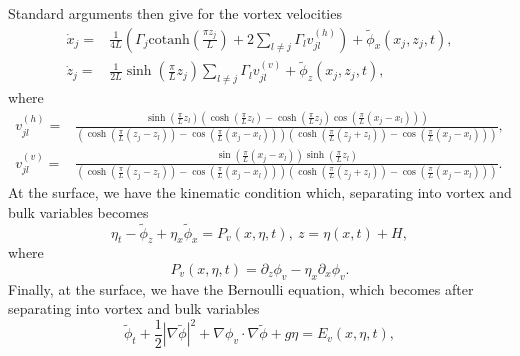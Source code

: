 \documentclass[a4paper,11pt]{article}
\newcommand{\p}{\partial}
\begin{document}
Standard arguments then give for the vortex velocities
\begin{align}
\dot{x}_{j} = & \frac{1}{4L}\left(  \Gamma_{j}\mbox{cotanh}\left(\frac{\pi z_{j}}{L} \right)+2\sum_{l\neq j}\Gamma_{l}v_{jl}^{(h)} \right)+ \tilde{\phi}_{x}(x_{j},z_{j},t),\label{xveloc}\\
\dot{z}_{j} = & \frac{1}{2L}\sinh\left(\frac{\pi}{L}z_{j}\right)\sum_{l\neq j} \Gamma_{l} v_{jl}^{(v)} + \tilde{\phi}_{z}(x_{j},z_{j},t),\label{zveloc}
\end{align}
where
\begin{align*}
v_{jl}^{(h)} = & \frac{\sinh\left(\frac{\pi}{L}z_{l}\right)\left(\cosh(\frac{\pi}{L}z_{l})-\cosh(\frac{\pi}{L}z_{j})\cos\left(\frac{\pi}{L}(x_{j}-x_{l})\right)\right)}{\left(\cosh\left(\frac{\pi}{L}(z_{j}-z_{l})\right)-\cos\left(\frac{\pi}{L}(x_{j}-x_{l})\right)\right)\left(\cosh\left(\frac{\pi}{L}(z_{j}+z_{l})\right)-\cos\left(\frac{\pi }{L}(x_{j}-x_{l})\right)\right)}, \\
v_{jl}^{(v)} = & \frac{\sin\left(\frac{\pi}{L}(x_{j}-x_{l})\right)\sinh\left(\frac{\pi}{L}z_{l}\right)}{\left(\cosh\left(\frac{\pi}{L}(z_{j}-z_{l})\right)-\cos\left(\frac{\pi}{L}(x_{j}-x_{l})\right)\right)\left(\cosh\left(\frac{\pi}{L}(z_{j}+z_{l})\right)-\cos\left(\frac{\pi }{L}(x_{j}-x_{l})\right)\right)}.
\end{align*}
At the surface, we have the kinematic condition which, separating into vortex and bulk variables becomes 
\begin{equation}
\eta_{t} - \tilde{\phi}_{z} + \eta_{x}\tilde{\phi}_{x} =  P_{v}(x,\eta,t), ~ z =  \eta(x,t)+H,  
\label{unsckin}
\end{equation}
where
\[
P_{v}(x,\eta,t) =   \p_{z}\phi_{v} -  \eta_{x}\p_{x}\phi_{v} .
\]
Finally, at the surface, we have the Bernoulli equation, which becomes after separating into vortex and bulk variables  
\begin{equation}
\tilde{\phi}_{t} + \frac{1}{2 }\left| \nabla \tilde{\phi} \right|^{2} +  \nabla\phi_{v}\cdot \nabla\tilde{\phi} + g\eta = E_{v}(x,\eta,t),
\label{unscbern}
\end{equation}
\end{document}
